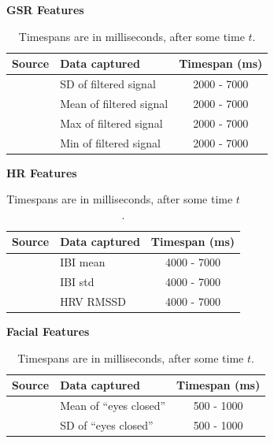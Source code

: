 \begin{table}
    {\large \textbf{GSR Features}}\vspace{2pt}
    \begin{tabularx}{\columnwidth}{cXc}
        \toprule
        \textbf{Source} & \textbf{Data captured} & \textbf{Timespan (ms)}\\
        \midrule
        \cite{gsr_len_lat3, gsr_data_processing} & SD of filtered signal & 2000 - 7000\\
        \cite{gsr_len_lat3, gsr_data_processing} & Mean of filtered signal & 2000 - 7000\\
        \cite{gsr_len_lat3, gsr_data_processing} & Max of filtered signal & 2000 - 7000\\
        \cite{gsr_len_lat3, gsr_data_processing} & Min of filtered signal & 2000 - 7000\\
        \bottomrule
    \end{tabularx}
    \label{[TABLE] features gsr}

    {\large \textbf{HR Features}}\vspace{2pt}
    \begin{tabularx}{\columnwidth}{cXc}
        \toprule
        \textbf{Source}                  & \textbf{Data captured} & \textbf{Timespan (ms)} \\
        \midrule
        \cite{hr_feature1, hrv_source_3} & IBI mean               & 4000 - 7000            \\
        \cite{hr_feature1}               & IBI std                & 4000 - 7000            \\
        \cite{hr_feature1}               & HRV RMSSD              & 4000 - 7000            \\
        \bottomrule
    \end{tabularx}
    \label{[TABLE] features hr}

    {\large \textbf{Facial Features}}\vspace{2pt}
    \begin{tabularx}{\columnwidth}{cXc}
        \toprule
        \textbf{Source} & \textbf{Data captured} & \textbf{Timespan (ms)} \\
        \midrule
        \cite{scherer_kinect} & Mean of ``eyes closed'' & 500 - 1000 \\
        \cite{scherer_kinect} & SD of ``eyes closed''   & 500 - 1000 \\
        \bottomrule
    \end{tabularx}
    \caption{Timespans are in milliseconds, after some time $t$.}
    \label{[TABLE] features face}
\end{table}

